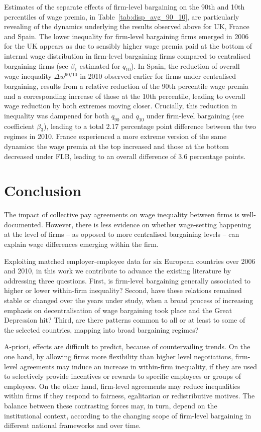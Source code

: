 \documentclass[12pt]{article}
\begin{document}
Estimates of the separate effects of firm-level bargaining on the 90th and 10th percentiles of wage premia, in Table~\ref{tab:disp_avg_90_10}, are particularly revealing of the dynamics underlying the results observed above for UK, France and Spain. The lower inequality for firm-level bargaining firms emerged in 2006 for the UK appears as due to sensibly higher wage premia paid at the bottom of internal wage distribution in firm-level bargaining firms compared to centralised bargaining firms (see $\beta_1$ estimated for $q_{10}$). In Spain, the reduction of overall wage inequality $\Delta w^{90/10}$ in 2010 observed earlier for firms under centralised bargaining, results from a relative reduction of the 90th percentile wage premia and a corresponding increase of those at the 10th percentile, leading to overall wage reduction by both extremes moving closer.
Crucially, this reduction in inequality was dampened for both $q_{90}$ and $q_{10}$ under firm-level bargaining (see coefficient $\beta_3$), leading to a total 2.17 percentage point difference between the two regimes in 2010. France experienced a more extreme version of the same dynamics: the wage premia at the top increased and those at the bottom decreased under FLB, leading to an overall difference of 3.6 percentage points.

\section{Conclusion}
\label{sec:conclusion}
The impact of collective pay agreements on wage inequality between firms is well-documented. However, there is less evidence on whether wage-setting happening at the level of firms -- as opposed to more centralised bargaining levels -- can explain wage differences emerging within the firm. 

Exploiting matched employer-employee data for six European countries over 2006 and 2010, in this work we contribute to advance the existing literature by addressing three questions. First, is firm-level bargaining generally associated to higher or lower within-firm inequality? Second, have these relations remained stable or changed over the years under study, when a broad process of increasing emphasis on decentralisation of wage bargaining took place and the Great Depression hit? Third, are there patterns common to all or at least to some of the selected countries, mapping into broad bargaining regimes?

A-priori, effects are difficult to predict, because of countervailing trends. On the one hand, by allowing firms more flexibility than higher level negotiations, firm-level agreements may induce an increase in within-firm inequality, if they are used to selectively provide incentives or rewards to specific employees or groups of employees. On the other hand, firm-level agreements may reduce inequalities within firms if they respond to fairness, egalitarian or redistributive motives. The balance between these contrasting forces may, in turn, depend on the institutional context, according to the changing scope of firm-level bargaining in different national frameworks and over time.
\end{document}
